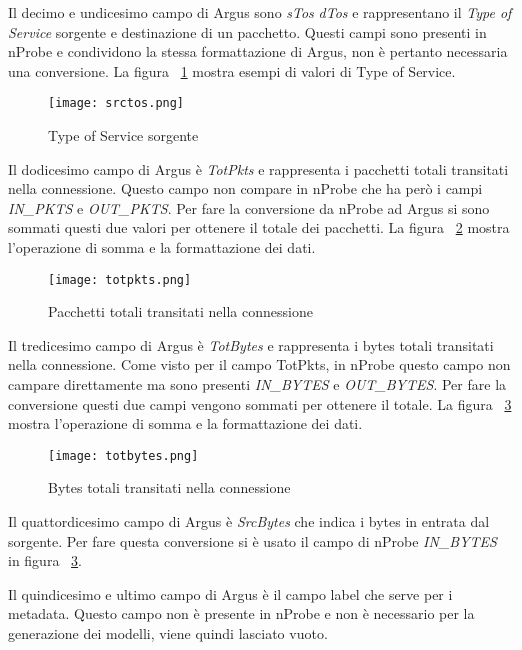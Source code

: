 \documentclass[../main.tex]{subfiles}
\begin{document}
Il decimo e undicesimo campo di Argus sono \textit{sTos} \textit{dTos} e rappresentano il \textit{Type of Service} sorgente e destinazione di un pacchetto. Questi campi sono presenti in nProbe e condividono la stessa formattazione di Argus, non è pertanto necessaria una conversione. La figura ~\ref{fig:srctos} mostra esempi di valori di Type of Service.
\begin{figure}[H]
				\centering
\texttt{[image: srctos.png]}
				\caption{Type of Service sorgente}
				\label{fig:srctos}
\end{figure}

Il dodicesimo campo di Argus è \textit{TotPkts} e rappresenta i pacchetti totali transitati nella connessione. Questo campo non compare in nProbe che ha però i campi \textit{IN\_PKTS} e \textit{OUT\_PKTS}. Per fare la conversione da nProbe ad Argus si sono sommati questi due valori per ottenere il totale dei pacchetti. La figura ~\ref{fig:totpkts} mostra l'operazione di somma e la formattazione dei dati.
\begin{figure}[H]
				\centering
\texttt{[image: totpkts.png]}
				\caption{Pacchetti totali transitati nella connessione}
				\label{fig:totpkts}
\end{figure}

Il tredicesimo campo di Argus è \textit{TotBytes} e rappresenta i bytes totali transitati nella connessione. Come visto per il campo TotPkts, in nProbe questo campo non campare direttamente ma sono presenti \textit{IN\_BYTES} e \textit{OUT\_BYTES}. Per fare la conversione questi due campi vengono sommati per ottenere il totale. La figura ~\ref{fig:totbytes} mostra l'operazione di somma e la formattazione dei dati.
\begin{figure}[H]
				\centering
\texttt{[image: totbytes.png]}
				\caption{Bytes totali transitati nella connessione}
				\label{fig:totbytes}
\end{figure}

Il quattordicesimo campo di Argus è \textit{SrcBytes} che indica i bytes in entrata dal sorgente. Per fare questa conversione si è usato il campo di nProbe \textit{IN\_BYTES} in figura ~\ref{fig:totbytes}.

Il quindicesimo e ultimo campo di Argus è il campo label che serve per i metadata. Questo campo non è presente in nProbe e non è necessario per la generazione dei modelli, viene quindi lasciato vuoto.
\end{document}
